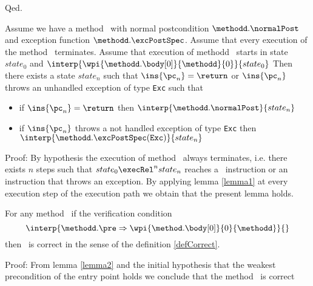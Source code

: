 Qed.


\begin{lemma2}\label{lemma2}
Assume we have a method \methodd \ with normal postcondition  $\methodd.\normalPost$ and exception function $\methodd.\excPostSpec$. 
Assume that every execution of the method \methodd \ terminates.
 Assume that  execution of methodd \methodd \ starts in state $state_0$ 
and $\interp{ \wpi{\methodd.\body[0] } {\methodd}{0}}{ state_0}$
Then there exists a state $state_n$ such that $\ins{\pc_n} = \return $ or $\ins{\pc_n}$ throws an unhandled 
exception of type \mbox{\rm\texttt{Exc}} such that
\begin{itemize}
    \item if $\ins{\pc_n} = \return $ then $\interp{ \methodd.\normalPost}{state_n}$
    \item  if $\ins{\pc_n}$ throws a not handled exception of type \texttt{Exc} then 
             $\interp{ \methodd.\excPostSpec(\mbox{\rm\texttt{Exc}}  )}{state_n}$
\end{itemize}
\end{lemma2}
Proof: 
By hypothesis the execution of method \methodd \ always terminates, i.e. there exists $n$ steps such that
$ state_0 \execRel^n state_n$ reaches a \return \ instruction or an instruction that throws an exception.
By applying lemma \ref{lemma1} at every execution step of the execution path we obtain that the present lemma holds.



\begin{vcGenCorrect}\label{vcGenCorrect}
For any  method \methodd \  if the verification condition 
$$ \interp{\methodd.\pre \Rightarrow \wpi{\method.\body[0]}{0}{\methodd}}{} $$
 then \methodd \ is correct in the sense of the definition \ref{defCorrect}. 
\end{vcGenCorrect}
Proof: From lemma \ref{lemma2} and the initial hypothesis that the weakest precondition of the 
entry point holds we conclude that the method \methodd \ is correct
